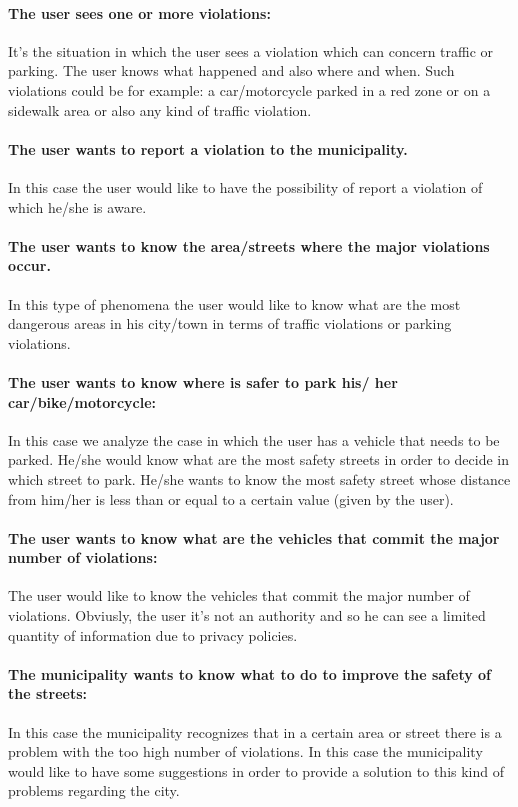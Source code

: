 \documentclass[titlepage]{article}
\begin{document}
\paragraph{The user sees one or more violations:}
It's the situation in which the user sees a violation which can concern traffic or parking. The user knows what happened and also where and when. Such violations could be for example: a car/motorcycle parked in a red zone or on a sidewalk area or also any kind of traffic violation.
\paragraph{The user wants to report a violation to the 					  municipality.}
In this case the user would like to have the possibility of report a violation of which he/she is aware. 
\paragraph{The user wants to know the area/streets where the 
	      major violations occur.}
In this type of phenomena the user would like to know what are the most dangerous areas in his city/town in terms of traffic violations or parking violations. 
\paragraph{The user wants to know where is safer to park his/			  her car/bike/motorcycle:}
In this case we analyze the case in which the user has a vehicle that needs to be parked. He/she would know what are the most safety streets in order to decide in which street to park. He/she wants to know the most safety street whose distance from him/her is less than or equal to a certain value (given by the user).
\paragraph{The user wants to know what are the vehicles that       		  commit the major number of violations:}
The user would like to know the vehicles that commit the major number of violations. Obviusly, the user it's not an authority and so he can see a limited quantity of information due to privacy policies.
\paragraph{The municipality wants to know what to do to 				improve the safety of the streets: }
In this case the municipality recognizes that in a certain area or street there is a problem with the too high number of violations. In this case the municipality would like to have some suggestions in order to provide a solution to this kind of problems regarding the city.
\end{document}

